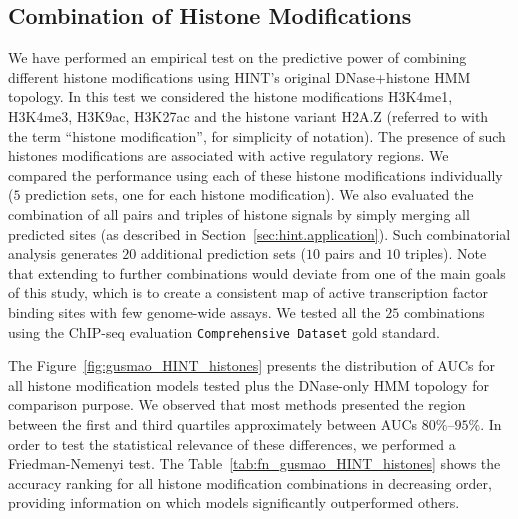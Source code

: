 \subsection{Combination of Histone Modifications}
\label{sec:ps.combination.histone.modifications}

We have performed an empirical test on the predictive power of combining different histone modifications using HINT's original DNase+histone HMM topology. In this test we considered the histone modifications H3K4me1, H3K4me3, H3K9ac, H3K27ac and the histone variant H2A.Z (referred to with the term ``histone modification'', for simplicity of notation). The presence of such histones modifications are associated with active regulatory regions. We compared the performance using each of these histone modifications individually ($5$ prediction sets, one for each histone modification). We also evaluated the combination of all pairs and triples of histone signals by simply merging all predicted sites (as described in Section~\ref{sec:hint.application}). Such combinatorial analysis generates $20$ additional prediction sets ($10$ pairs and $10$ triples). Note that extending to further combinations would deviate from one of the main goals of this study, which is to create a consistent map of active transcription factor binding sites with few genome-wide assays. We tested all the $25$ combinations using the ChIP-seq evaluation {\tt Comprehensive Dataset} gold standard.

The Figure~\ref{fig:gusmao_HINT_histones} presents the distribution of AUCs for all histone modification models tested plus the DNase-only HMM topology for comparison purpose. We observed that most methods presented the region between the first and third quartiles approximately between AUCs $80\%$--$95\%$. In order to test the statistical relevance of these differences, we performed a Friedman-Nemenyi test. The Table~\ref{tab:fn_gusmao_HINT_histones} shows the accuracy ranking for all histone modification combinations in decreasing order, providing information on which models significantly outperformed others.

